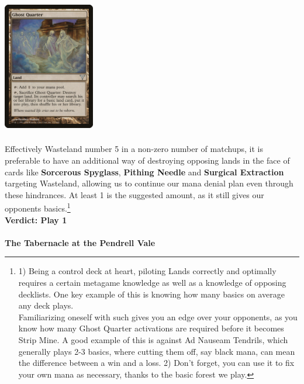 \documentclass{report}
\begin{document}
\begin{center}
\includegraphics [width = 4cm, height = 6cm] {ghost-quarter}
\end{center}Effectively Wasteland number 5 in a non-zero number of matchups, it is preferable to have an additional way of destroying opposing lands in the face of cards like \textbf{Sorcerous Spyglass}, \textbf{Pithing Needle} and \textbf{Surgical Extraction} targeting Wasteland, allowing us to continue our mana denial plan even through these hindrances. At least 1 is the suggested amount, as it still gives our opponents basics.\footnote{1) Being a control deck at heart, piloting Lands correctly and optimally requires a certain metagame knowledge as well as a knowledge of opposing decklists. One key example of this is knowing how many basics on average any deck plays.\\Familiarizing oneself with such gives you an edge over your opponents, as you know how many Ghost Quarter activations are required before it becomes Strip Mine.  A good example of this is against Ad Nauseam Tendrils, which generally plays 2-3 basics, where cutting them off, say black mana, can mean the difference between a win and a loss.
2) Don't forget, you can use it to fix your own mana as necessary, thanks to the basic forest we play.}
\\\textbf{Verdict: Play 1\\\\}
\textbf{The Tabernacle at the Pendrell Vale}
\end{document}
